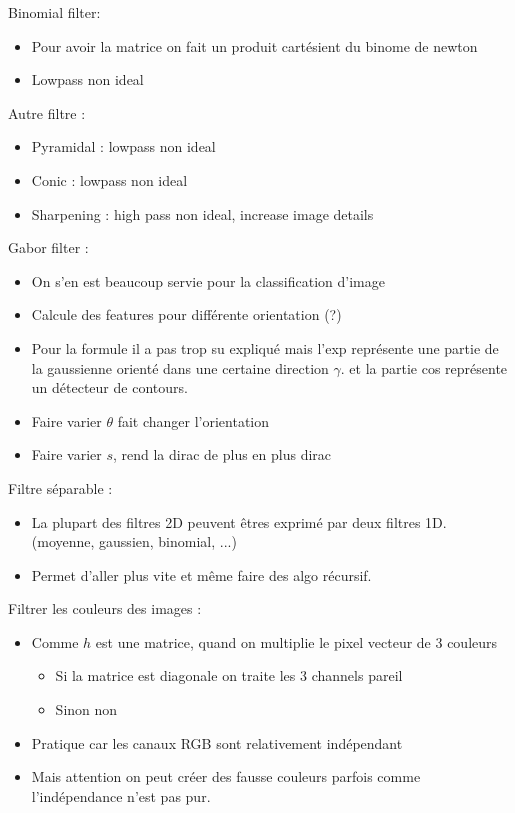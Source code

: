 \documentclass{article}
\theoremstyle{plain}%
\theoremstyle{definition}
\theoremstyle{remark}
\begin{document}
Binomial filter:
\begin{itemize}
    \item Pour avoir la matrice on fait un produit cartésient du binome de newton
    \item Lowpass non ideal 
\end{itemize}
Autre filtre : 
\begin{itemize}
    \item Pyramidal : lowpass non ideal
    \item Conic : lowpass non ideal 
    \item Sharpening : high pass non ideal, increase image details
\end{itemize}

Gabor filter : 
\begin{itemize}
    \item On s'en est beaucoup servie pour la classification d'image
    \item Calcule des features pour différente orientation (?)
    \item Pour la formule il a pas trop su expliqué mais l'exp représente une partie de la gaussienne orienté dans une certaine direction $ \gamma  $. et la partie cos représente un détecteur de contours.
    \item Faire varier $ \theta  $ fait changer l'orientation 
    \item Faire varier $ s $, rend la dirac de plus en plus dirac
\end{itemize}

Filtre séparable :
\begin{itemize}
    \item La plupart des filtres 2D peuvent êtres exprimé par deux filtres 1D. (moyenne, gaussien, binomial, ...)
    \item Permet d'aller plus vite et même faire des algo récursif.
\end{itemize}

Filtrer les couleurs des images :
\begin{itemize}
    \item Comme $ h $ est une matrice, quand on multiplie le pixel vecteur de 3 couleurs \begin{itemize}
        \item Si la matrice est diagonale on traite les 3 channels pareil 
        \item Sinon non 
    \end{itemize}
    \item Pratique car les canaux RGB sont relativement indépendant 
    \item Mais attention on peut créer des fausse couleurs parfois comme l'indépendance n'est pas pur.
\end{itemize}
\end{document}
